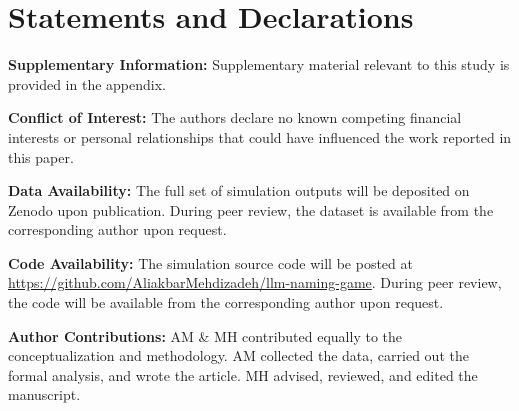 \documentclass{article}
\begin{document}
\section*{Statements and Declarations}

\textbf{Supplementary Information:} Supplementary material relevant to this study is provided in the appendix.

\textbf{Conflict of Interest:} The authors declare no known competing financial interests or personal relationships that could have influenced the work reported in this paper.

\textbf{Data Availability:} The full set of simulation outputs will be deposited on Zenodo upon publication. During peer review, the dataset is available from the corresponding author upon request.

\textbf{Code Availability:} The simulation source code will be posted at \url{https://github.com/AliakbarMehdizadeh/llm-naming-game}. During peer review, the code will be available from the corresponding author upon request.

\textbf{Author Contributions:} AM \& MH contributed equally to the conceptualization and methodology. AM collected the data, carried out the formal analysis, and wrote the article. MH advised, reviewed, and edited the manuscript.

  
\end{document}
